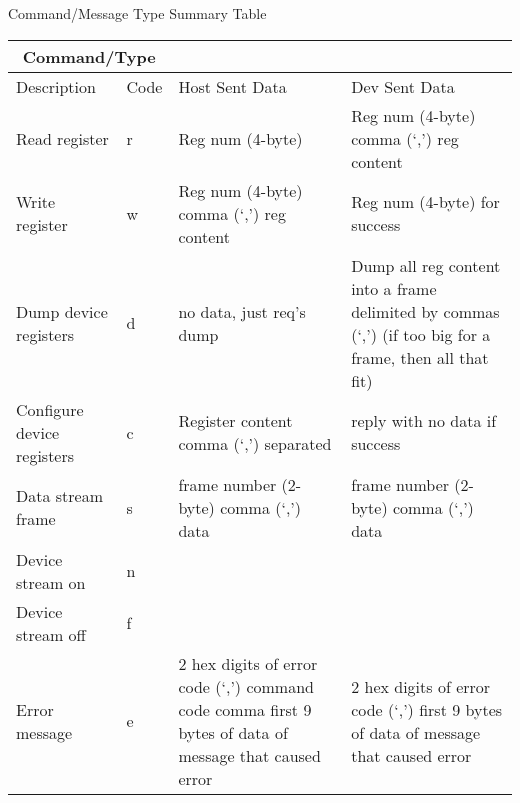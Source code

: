 \documentclass{customdocclass}
\begin{document}
\begin{center}
\small
Command/Message Type Summary Table
\begin{tabularx}{\textwidth}{|X|l|X|X|} \hline
\multicolumn{2}{|c|}{Command/Type} & & \\ \hline
Description & Code & Host Sent Data & Dev Sent Data \\ \hline
Read register & r & Reg num (4-byte) & Reg num (4-byte) comma (`,') reg content \\ \hline
Write register & w & Reg num (4-byte) comma (`,') reg content & Reg num (4-byte) for success \\ \hline
Dump device registers & d & no data, just req's dump & Dump all reg content into a frame delimited by commas (`,') (if too big for a frame, then all that fit) \\ \hline
Configure device registers & c & Register content comma (`,') separated & reply with no data if success \\ \hline
Data stream frame & s & frame number (2-byte) comma (`,') data &  frame number (2-byte) comma (`,') data \\ \hline
Device stream on & n & & \\ \hline
Device stream off & f & & \\ \hline
Error message & e & 2 hex digits of error code (`,') command code comma first 9 bytes of data of message that caused error &  2 hex digits of error code (`,') first 9 bytes of data of message that caused error \\ \hline
\end{tabularx}
\end{center}
\end{document}
